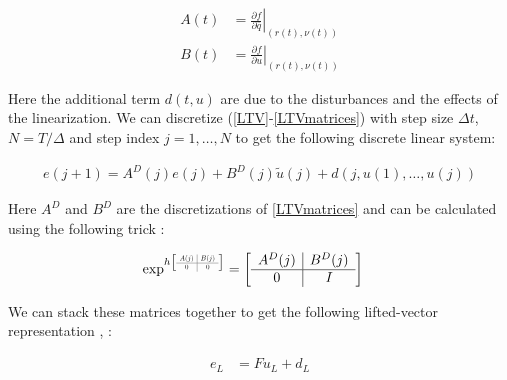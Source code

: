 \documentclass[10pt,a4paper]{article}
\newcommand\at[2]{\left.#1\right|_{#2}} %
\newcommand\scalemath[2]{\scalebox{#1}{\mbox{\ensuremath{\displaystyle #2}}}} %
\newcommand{\joint}{q} %
\newcommand{\state}{\bar{\joint}} %
\newcommand{\error}{e} %
\newcommand{\traj}{r} %
\newcommand{\linDist}{d} %
\newcommand{\sysInput}{u} %
\newcommand{\linInput}{\tilde{u}} %
\newcommand{\trjInput}{\nu} %
\newcommand{\dynamics}{f}
\begin{document}
\begin{equation}
\begin{aligned}
A(t) &= \at{\frac{\partial{\dynamics}}{\partial{\state}}}{(\traj(t),\trjInput(t))} \\
B(t) &= \at{\frac{\partial{\dynamics}}{\partial{\sysInput}}}{(\traj(t),\trjInput(t))}
\end{aligned}
\label{LTVmatrices}
\end{equation}

Here the additional term $\linDist(t,\sysInput)$ are due to the disturbances and the effects of the linearization. We can discretize (\ref{LTV}-\ref{LTVmatrices}) with step size $\Delta t$, $N = T/\Delta$ and step index $j = 1, \ldots, N$ to get the following discrete linear system:

\begin{equation}
\begin{aligned}
\error(j+1) = A^{D}(j)\error(j) + B^{D}(j)\linInput(j) + \linDist(j, \sysInput(1), \ldots, \sysInput(j))
\end{aligned}
\label{discreteLTV}
\end{equation}

Here $A^D$ and $B^D$ are the discretizations of \eqref{LTVmatrices} and can be calculated using the following trick \cite{Schoellig12}:

\begin{equation}
\begin{aligned}
\exp^{h
\left[
\scalemath{0.5}{
\begin{array}{c|c}
A(j) & B(j) \\ \hline
0 & 0
\end{array}}\right]}
&= 
\left[
\begin{array}{c|c}
A^{D}(j) & B^{D}(j) \\ \hline
0 & I
\end{array}\right] 
\end{aligned}
\label{discreteMatrices}
\end{equation}

We can stack these matrices together to get the following lifted-vector representation \cite{Bristow06}, \cite{Schoellig12}:

\begin{equation}
\begin{aligned}
\error_L &= F\sysInput_L + \linDist_L \\
\end{aligned}
\label{liftedLTV}
\end{equation}
\end{document}
